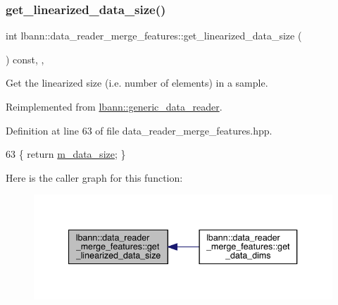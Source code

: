 \subsubsection{\texorpdfstring{get\+\_\+linearized\+\_\+data\+\_\+size()}{get\_linearized\_data\_size()}}
{\footnotesize\ttfamily int lbann\+::data\+\_\+reader\+\_\+merge\+\_\+features\+::get\+\_\+linearized\+\_\+data\+\_\+size (\begin{DoxyParamCaption}{ }\end{DoxyParamCaption}) const\hspace{0.3cm}{\ttfamily [inline]}, {\ttfamily [override]}, {\ttfamily [virtual]}}



Get the linearized size (i.\+e. number of elements) in a sample. 



Reimplemented from \hyperlink{classlbann_1_1generic__data__reader_a246a719477c8c7b6122d41b6f5618d41}{lbann\+::generic\+\_\+data\+\_\+reader}.



Definition at line 63 of file data\+\_\+reader\+\_\+merge\+\_\+features.\+hpp.


\begin{DoxyCode}
63 \{ \textcolor{keywordflow}{return} \hyperlink{classlbann_1_1data__reader__merge__features_ac9c56e08a45a5beac97e41e403fbaa12}{m\_data\_size}; \}
\end{DoxyCode}
Here is the caller graph for this function\+:\nopagebreak
\begin{figure}[H]
\begin{center}
\leavevmode
\includegraphics[width=340pt]{classlbann_1_1data__reader__merge__features_a9cf5a37a562c5bdd3861da9ec2e54638_icgraph}
\end{center}
\end{figure}
\mbox{\label{classlbann_1_1data__reader__merge__features_aa50959f29f761916a3cef60f33740516}} 
